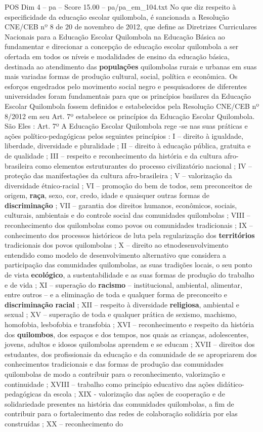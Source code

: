 \begin{textsample}{POS Dim 4 – pa – Score 15.00 – pa/pa\_em\_104.txt}
No que diz respeito à especificidade da educação escolar quilombola, é sancionada a Resolução CNE/CEB nº 8 de 20 de novembro de 2012, que define as Diretrizes Curriculares Nacionais para a Educação Escolar Quilombola na Educação Básica ao fundamentar e direcionar a concepção de educação escolar quilombola a ser ofertada em todos os níveis e modalidades de ensino da educação básica, destinada ao atendimento das \textbf{populações} quilombolas rurais e urbanas em suas mais variadas formas de produção cultural, social, política e econômica.
Os esforços engedrados pelo movimento social negro e pesquisadores de diferentes universidades foram fundamentais para que os princípios basilares da Educação Escolar Quilombola fossem definidos e estabelecidos pela Resolução CNE/CEB nº 8/2012 em seu Art. 7º estabelece os princípios da Educação Escolar Quilombola.
São Eles : Art. 7º A Educação Escolar Quilombola rege -se nas suas práticas e ações político-pedagógicas pelos seguintes princípios : I – direito à igualdade, liberdade, diversidade e pluralidade ; II – direito à educação pública, gratuita e de qualidade ; III – respeito e reconhecimento da história e da cultura afro-brasileira como elementos estruturantes do processo civilizatório nacional ; IV – proteção das manifestações da cultura afro-brasileira ; V – valorização da diversidade étnico-racial ; VI – promoção do bem de todos, sem preconceitos de origem, \textbf{raça}, sexo, cor, credo, idade e quaisquer outras formas de \textbf{discriminação} ; VII – garantia dos direitos humanos, econômicos, sociais, culturais, ambientais e do controle social das comunidades quilombolas ; VIII – reconhecimento dos quilombolas como povos ou comunidades tradicionais ; IX – conhecimento dos processos históricos de luta pela regularização dos \textbf{territórios} tradicionais dos povos quilombolas ; X – direito ao etnodesenvolvimento entendido como modelo de desenvolvimento alternativo que considera a participação das comunidades quilombolas, as suas tradições locais, o seu ponto de vista \textbf{ecológico}, a sustentabilidade e as suas formas de produção do trabalho e de vida ; XI – superação do \textbf{racismo} – institucional, ambiental, alimentar, entre outros – e a eliminação de toda e qualquer forma de preconceito e \textbf{discriminação} \textbf{racial} ; XII – respeito à diversidade \textbf{religiosa}, ambiental e sexual ; XV – superação de toda e qualquer prática de sexismo, machismo, homofobia, lesbofobia e transfobia ; XVI – reconhecimento e respeito da história dos \textbf{quilombos}, dos espaços e dos tempos, nos quais as crianças, adolescentes, jovens, adultos e idosos quilombolas aprendem e se educam ; XVII – direitos dos estudantes, dos profissionais da educação e da comunidade de se apropriarem dos conhecimentos tradicionais e das formas de produção das comunidades quilombolas de modo a contribuir para o reconhecimento, valorização e continuidade ; XVIII – trabalho como princípio educativo das ações didático-pedagógicas da escola ; XIX - valorização das ações de cooperação e de solidariedade presentes na história das comunidades quilombolas, a fim de contribuir para o fortalecimento das redes de colaboração solidária por elas construídas ; XX – reconhecimento do 
\end{textsample}
